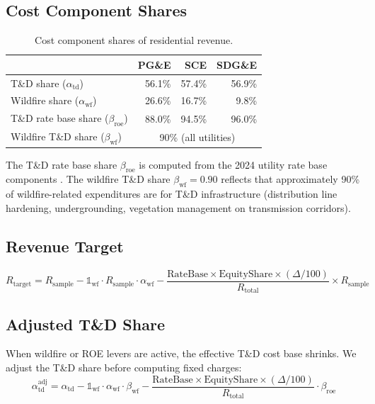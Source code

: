\documentclass[11pt]{article}
\begin{document}
\subsection{Cost Component Shares}

\begin{table}[htbp]
\centering
\caption{Cost component shares of residential revenue.}
\label{tab:cost_shares}
\small
\begin{tabular}{l r r r}
\toprule
& \textbf{PG\&E} & \textbf{SCE} & \textbf{SDG\&E} \\
\midrule
T\&D share ($\alpha_{\text{td}}$) & 56.1\% & 57.4\% & 56.9\% \\
Wildfire share ($\alpha_{\text{wf}}$) & 26.6\% & 16.7\% & 9.8\% \\
T\&D rate base share ($\beta_{\text{roe}}$) & 88.0\% & 94.5\% & 96.0\% \\
Wildfire T\&D share ($\beta_{\text{wf}}$) & \multicolumn{3}{c}{90\% (all utilities)} \\
\bottomrule
\end{tabular}
\end{table}

The T\&D rate base share $\beta_{\text{roe}}$ is computed from the 2024 utility rate base components \cite{cpuc2024}. The wildfire T\&D share $\beta_{\text{wf}} = 0.90$ reflects that approximately 90\% of wildfire-related expenditures are for T\&D infrastructure (distribution line hardening, undergrounding, vegetation management on transmission corridors).

\subsection{Revenue Target}

\begin{equation}
R_{\text{target}} = R_{\text{sample}} - \mathbb{1}_{\text{wf}} \cdot R_{\text{sample}} \cdot \alpha_{\text{wf}} - \frac{\text{RateBase} \times \text{EquityShare} \times (\Delta/100)}{R_{\text{total}}} \times R_{\text{sample}}
\end{equation}

\subsection{Adjusted T\&D Share}

When wildfire or ROE levers are active, the effective T\&D cost base shrinks. We adjust the T\&D share before computing fixed charges:
\begin{equation}
\alpha_{\text{td}}^{\text{adj}} = \alpha_{\text{td}} - \mathbb{1}_{\text{wf}} \cdot \alpha_{\text{wf}} \cdot \beta_{\text{wf}} - \frac{\text{RateBase} \times \text{EquityShare} \times (\Delta/100)}{R_{\text{total}}} \cdot \beta_{\text{roe}}
\end{equation}
\end{document}
